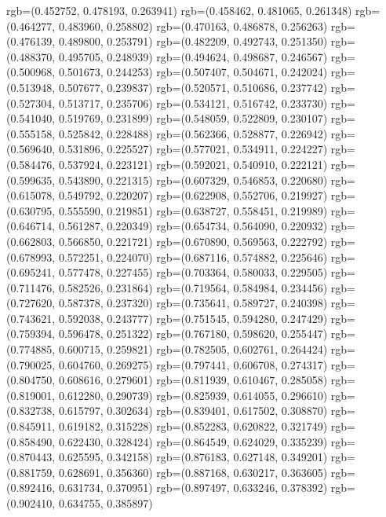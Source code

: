 {{{					rgb=(0.452752, 0.478193, 0.263941)
					rgb=(0.458462, 0.481065, 0.261348)
					rgb=(0.464277, 0.483960, 0.258802)
					rgb=(0.470163, 0.486878, 0.256263)
					rgb=(0.476139, 0.489800, 0.253791)
					rgb=(0.482209, 0.492743, 0.251350)
					rgb=(0.488370, 0.495705, 0.248939)
					rgb=(0.494624, 0.498687, 0.246567)
					rgb=(0.500968, 0.501673, 0.244253)
					rgb=(0.507407, 0.504671, 0.242024)
					rgb=(0.513948, 0.507677, 0.239837)
					rgb=(0.520571, 0.510686, 0.237742)
					rgb=(0.527304, 0.513717, 0.235706)
					rgb=(0.534121, 0.516742, 0.233730)
					rgb=(0.541040, 0.519769, 0.231899)
					rgb=(0.548059, 0.522809, 0.230107)
					rgb=(0.555158, 0.525842, 0.228488)
					rgb=(0.562366, 0.528877, 0.226942)
					rgb=(0.569640, 0.531896, 0.225527)
					rgb=(0.577021, 0.534911, 0.224227)
					rgb=(0.584476, 0.537924, 0.223121)
					rgb=(0.592021, 0.540910, 0.222121)
					rgb=(0.599635, 0.543890, 0.221315)
					rgb=(0.607329, 0.546853, 0.220680)
					rgb=(0.615078, 0.549792, 0.220207)
					rgb=(0.622908, 0.552706, 0.219927)
					rgb=(0.630795, 0.555590, 0.219851)
					rgb=(0.638727, 0.558451, 0.219989)
					rgb=(0.646714, 0.561287, 0.220349)
					rgb=(0.654734, 0.564090, 0.220932)
					rgb=(0.662803, 0.566850, 0.221721)
					rgb=(0.670890, 0.569563, 0.222792)
					rgb=(0.678993, 0.572251, 0.224070)
					rgb=(0.687116, 0.574882, 0.225646)
					rgb=(0.695241, 0.577478, 0.227455)
					rgb=(0.703364, 0.580033, 0.229505)
					rgb=(0.711476, 0.582526, 0.231864)
					rgb=(0.719564, 0.584984, 0.234456)
					rgb=(0.727620, 0.587378, 0.237320)
					rgb=(0.735641, 0.589727, 0.240398)
					rgb=(0.743621, 0.592038, 0.243777)
					rgb=(0.751545, 0.594280, 0.247429)
					rgb=(0.759394, 0.596478, 0.251322)
					rgb=(0.767180, 0.598620, 0.255447)
					rgb=(0.774885, 0.600715, 0.259821)
					rgb=(0.782505, 0.602761, 0.264424)
					rgb=(0.790025, 0.604760, 0.269275)
					rgb=(0.797441, 0.606708, 0.274317)
					rgb=(0.804750, 0.608616, 0.279601)
					rgb=(0.811939, 0.610467, 0.285058)
					rgb=(0.819001, 0.612280, 0.290739)
					rgb=(0.825939, 0.614055, 0.296610)
					rgb=(0.832738, 0.615797, 0.302634)
					rgb=(0.839401, 0.617502, 0.308870)
					rgb=(0.845911, 0.619182, 0.315228)
					rgb=(0.852283, 0.620822, 0.321749)
					rgb=(0.858490, 0.622430, 0.328424)
					rgb=(0.864549, 0.624029, 0.335239)
					rgb=(0.870443, 0.625595, 0.342158)
					rgb=(0.876183, 0.627148, 0.349201)
					rgb=(0.881759, 0.628691, 0.356360)
					rgb=(0.887168, 0.630217, 0.363605)
					rgb=(0.892416, 0.631734, 0.370951)
					rgb=(0.897497, 0.633246, 0.378392)
					rgb=(0.902410, 0.634755, 0.385897)
}}}
